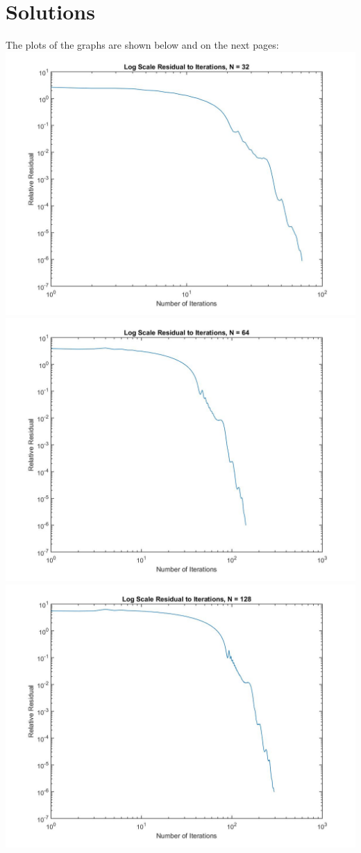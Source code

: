 \documentclass[12pt]{article}
\begin{document}
\section{Solutions}
The plots of the graphs are shown below and on the next pages: \\
\includegraphics[scale = 0.35]{logplotN-32.jpg} \\
\includegraphics[scale = 0.35]{logplotN-64.jpg} \\
\includegraphics[scale = 0.35]{logplotN-128.jpg} \\
\end{document}
